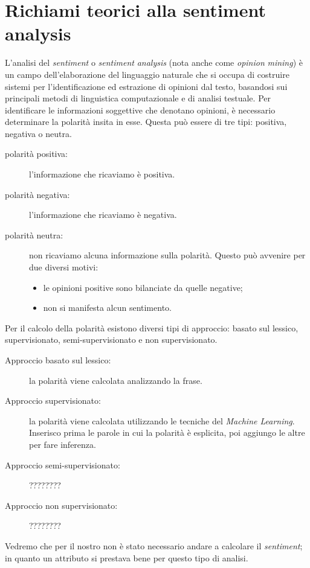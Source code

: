 \chapter{Richiami teorici alla sentiment analysis}
	L'analisi del \textit{sentiment} o \textit{sentiment} \textit{analysis} (nota anche come \textit{opinion} \textit{mining}) è un campo dell'elaborazione del linguaggio naturale che si occupa di costruire sistemi per l'identificazione ed estrazione di opinioni dal testo, basandosi sui principali metodi di linguistica computazionale e di analisi testuale. Per identificare le informazioni soggettive che denotano opinioni, è necessario determinare la polarità insita in esse. Questa può essere di tre tipi: positiva, negativa o neutra.
		
	\begin{description}
		\item [polarità positiva:] l'informazione che ricaviamo è positiva.	
		\item [polarità negativa:] l'informazione che ricaviamo è negativa.
		\item [polarità neutra:] non ricaviamo alcuna informazione sulla polarità. Questo può avvenire per due diversi motivi:
			
		\begin{itemize}
			\item le opinioni positive sono bilanciate da quelle negative;
			\item non si manifesta alcun sentimento.
		\end{itemize}
			
	\end{description}
	
	Per il calcolo della polarità esistono diversi tipi di approccio: basato sul lessico, supervisionato, semi-supervisionato e non supervisionato.
		
	\begin{description}
		\item [Approccio basato sul lessico:] la polarità viene calcolata analizzando la frase.
		\item [Approccio supervisionato:] la polarità viene calcolata utilizzando le tecniche del \textit{Machine Learning}. Inserisco prima le parole in cui la polarità è esplicita, poi aggiungo le altre per fare inferenza.
		\item [Approccio semi-supervisionato:] ????????
		\item [Approccio non supervisionato:] ????????	
	\end{description}
		
	Vedremo che per il nostro non è stato necessario andare a calcolare il \textit{sentiment}; in quanto un attributo si prestava bene per questo tipo di analisi.